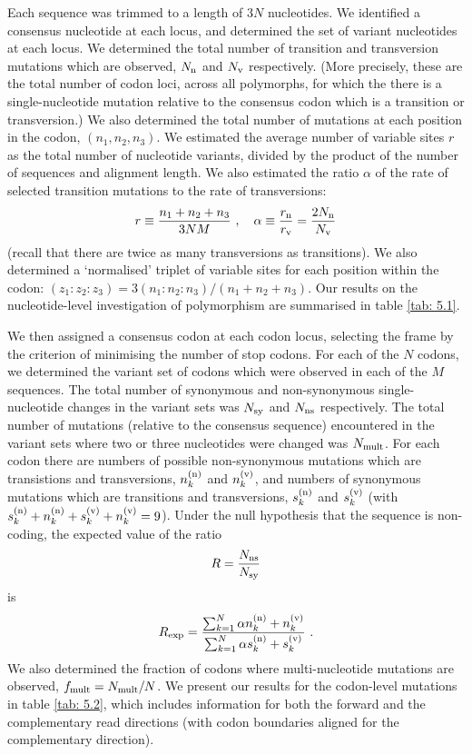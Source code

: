 \documentclass[unnumsec,webpdf,contemporary,large]{oup-authoring-template}%
\theoremstyle{thmstyleone}%
\theoremstyle{thmstyletwo}%
\theoremstyle{thmstylethree}%
\begin{document}
Each sequence was trimmed to a length of $3N$ nucleotides. We identified a consensus
nucleotide at each locus, and determined the set of variant nucleotides at each locus.
We determined the total number of transition and transversion mutations which are observed,
$N_{\rm n}$ and $N_{\rm v}$ respectively.
(More precisely, these are the total number of codon loci, across all polymorphs, for which the
there is a single-nucleotide mutation relative to the consensus codon which is a transition or transversion.)
We also determined the total number of mutations at each position in the codon, $(n_1,n_2,n_3)$.
We estimated the average number of variable sites $r$ as the total number of nucleotide variants,
divided by the product of the number of sequences and alignment length. We also
estimated the ratio $\alpha$ of the rate of selected transition mutations to the rate of transversions:
%
\begin{equation}
\label{eq: 5.1}
r\equiv \frac{n_1+n_2+n_3}{3NM}
\ ,\ \ \
\alpha\equiv \frac{r_{\rm n}}{r_{\rm v}}=\frac{2N_{\rm n}}{N_{\rm v}}
\end{equation}
%
(recall that there are twice as many transversions as transitions). We also determined a \lq normalised'
triplet of variable sites for each position within the codon: $(z_1:z_2:z_3)=3(n_1:n_2:n_3)/(n_1+n_2+n_3)$.
Our results on the nucleotide-level
investigation of polymorphism are summarised in table \ref{tab: 5.1}.

We then assigned a consensus codon at each codon locus, selecting the
frame by the criterion of minimising the number of stop codons.
For each of the $N$ codons, we determined the variant set of codons
which were observed in each of the $M$ sequences. The total
number of synonymous and non-synonymous single-nucleotide changes in the variant sets
was $N_{\rm sy}$ and $N_{\rm ns}$ respectively. The total number of
mutations (relative to the consensus sequence)
encountered in the variant sets where two or three nucleotides were changed was $N_{\rm mult}$.
For each codon there are
numbers of possible non-synonymous mutations which are transistions and transversions,
$n_k^{({\rm n})}$ and $n_k^{({\rm v})}$, and numbers of synonymous mutations
which are transitions and transversions, $s_k^{({\rm n})}$ and $s_k^{({\rm v})}$
(with $s_k^{({\rm n})}+n_k^{({\rm n})}+s_k^{({\rm v})}+n_k^{({\rm v})}=9$). Under the null
hypothesis that the sequence is non-coding, the expected value of the ratio
%
\begin{equation}
\label{eq: 5.2}
R=\frac{N_{\rm ns}}{N_{\rm sy}}
\end{equation}
%
is
%
\begin{equation}
\label{eq: 5.3}
R_{\rm exp}=\frac{\sum_{k=1}^N\alpha n_k^{({\rm n})}+n_k^{({\rm v})}}
{\sum_{k=1}^N\alpha s_k^{({\rm n})}+s_k^{({\rm v})}}
\ .
\end{equation}
%
We also determined the fraction of codons where multi-nucleotide mutations are observed,
$f_{\rm mult}=N_{\rm mult}/N$.
We present our results for the codon-level mutations in table \ref{tab: 5.2}, which includes information
for both the forward and the complementary read directions (with codon boundaries aligned
for the complementary direction).
\end{document}
